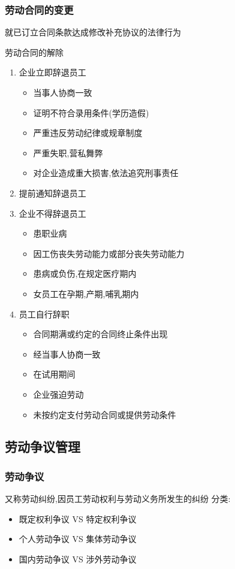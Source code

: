 \documentclass{ctexart}
\begin{document}
\subsubsection{劳动合同的变更}
\label{sec-3-2-7}
就已订立合同条款达成修改补充协议的法律行为

劳动合同的解除

\begin{enumerate}
\item 企业立即辞退员工
\label{sec-3-2-7-1}
\begin{itemize}
\item 当事人协商一致
\item 证明不符合录用条件(学历造假)
\item 严重违反劳动纪律或规章制度
\item 严重失职,营私舞弊
\item 对企业造成重大损害,依法追究刑事责任
\end{itemize}
\item 提前通知辞退员工
\label{sec-3-2-7-2}
\item 企业不得辞退员工
\label{sec-3-2-7-3}
\begin{itemize}
\item 患职业病
\item 因工伤丧失劳动能力或部分丧失劳动能力
\item 患病或负伤,在规定医疗期内
\item 女员工在孕期,产期,哺乳期内
\end{itemize}
\item 员工自行辞职
\label{sec-3-2-7-4}
\begin{itemize}
\item 合同期满或约定的合同终止条件出现
\item 经当事人协商一致
\item 在试用期间
\item 企业强迫劳动
\item 未按约定支付劳动合同或提供劳动条件
\end{itemize}
\end{enumerate}
\subsection{劳动争议管理}
\label{sec-3-3}
\subsubsection{劳动争议}
\label{sec-3-3-1}
又称劳动纠纷,因员工劳动权利与劳动义务所发生的纠纷
分类:
\begin{itemize}
\item 既定权利争议 VS 特定权利争议
\item 个人劳动争议 VS 集体劳动争议
\item 国内劳动争议 VS 涉外劳动争议
\end{itemize}
\end{document}
